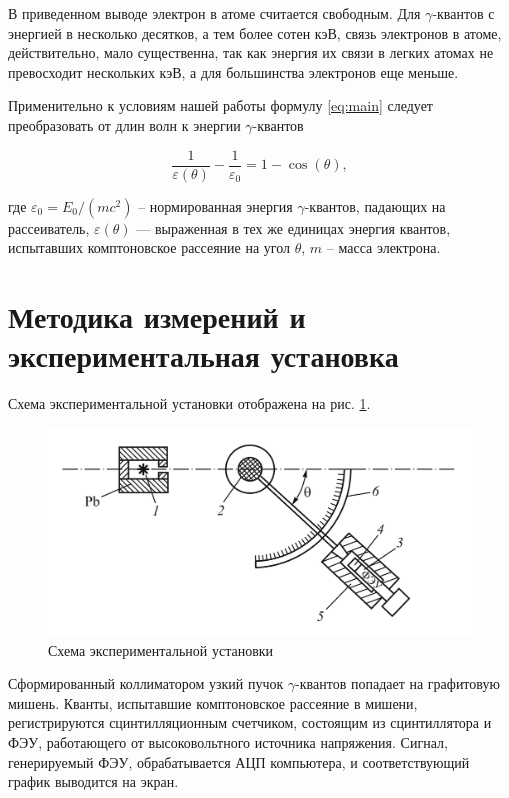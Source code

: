 \documentclass[a4paper, 12pt]{article}
\begin{document}
	В приведенном выводе электрон в атоме считается свободным. Для $\gamma$-квантов с энергией в несколько десятков, а тем более сотен кэВ,	связь электронов в атоме, действительно,	мало существенна, так как энергия их связи в легких атомах не превосходит нескольких кэВ, а для большинства электронов еще меньше.
	
    Применительно к условиям нашей работы формулу \eqref{eq:main} следует	преобразовать от длин волн к энергии $\gamma$-квантов
    
	\begin{equation}
    \label{eq:main_norm}
		\dfrac{1}{\varepsilon(\theta)} - \dfrac{1}{\varepsilon_0} = 1- \cos(\theta),
	\end{equation}
 
	где $ \varepsilon_0 = E_0/(m c^2) $  -- нормированная энергия $\gamma$-квантов, падающих на рассеиватель, $ \varepsilon(\theta) $ — выраженная в тех же единицах энергия квантов, испытавших комптоновское рассеяние на угол $\theta$, $ m $ -- масса электрона.

    \newpage
    
    \section{Методика измерений и экспериментальная установка}
	
	Схема экспериментальной установки отображена на рис. \ref{installation}.	
 
	\begin{figure}[H]
		\centering
		\includegraphics[width=0.7\linewidth]{images/installation.png}
		\caption{Схема экспериментальной установки}
		\label{installation}
	\end{figure}
 
	Сформированный коллиматором узкий пучок $\gamma$-квантов попадает на графитовую мишень. Кванты, испытавшие комптоновское рассеяние в мишени, регистрируются сцинтилляционным счетчиком, состоящим из сцинтиллятора и ФЭУ, работающего от высоковольтного источника напряжения. Сигнал, генерируемый ФЭУ, обрабатывается АЦП компьютера, и соответствующий график выводится на экран.
\end{document}
